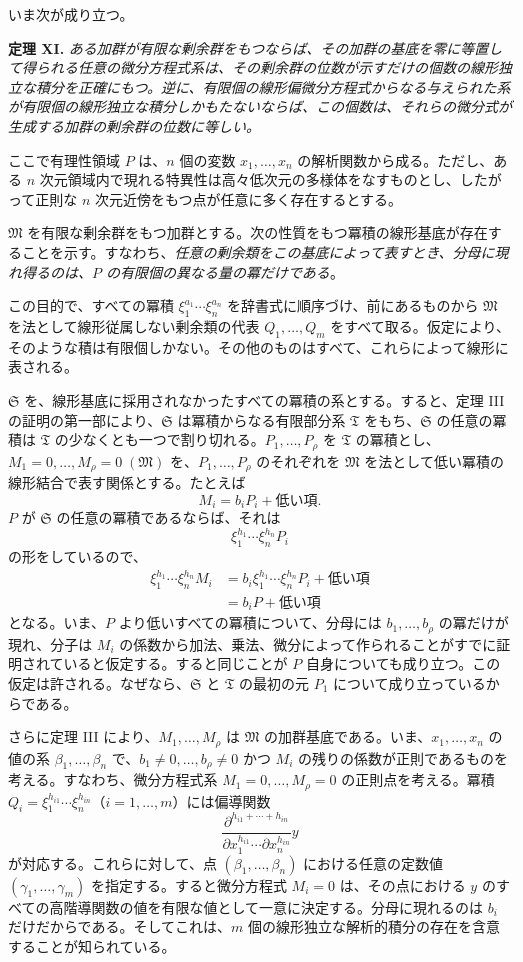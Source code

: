 \documentclass[11pt]{article}
\begin{document}
いま次が成り立つ。

\textbf{定理 XI.} \emph{ある加群が有限な剰余群をもつならば、その加群の基底を零に等置して得られる任意の微分方程式系は、その剰余群の位数が示すだけの個数の線形独立な積分を正確にもつ。逆に、有限個の線形偏微分方程式からなる与えられた系が有限個の線形独立な積分しかもたないならば、この個数は、それらの微分式が生成する加群の剰余群の位数に等しい。}

ここで有理性領域 $P$ は、$n$ 個の変数 $x_1,\ldots,x_n$ の解析関数から成る。ただし、ある $n$ 次元領域内で現れる特異性は高々低次元の多様体をなすものとし、したがって正則な $n$ 次元近傍をもつ点が任意に多く存在するとする。

$\mathfrak M$ を有限な剰余群をもつ加群とする。次の性質をもつ冪積の線形基底が存在することを示す。すなわち、\emph{任意の剰余類をこの基底によって表すとき、分母に現れ得るのは、$P$ の有限個の異なる量の冪だけである}。

この目的で、すべての冪積 $\xi_1^{a_1}\cdots\xi_n^{a_n}$ を辞書式に順序づけ、前にあるものから $\mathfrak M$ を法として線形従属しない剰余類の代表 $Q_1,\ldots,Q_m$ をすべて取る。仮定により、そのような積は有限個しかない。その他のものはすべて、これらによって線形に表される。

$\mathfrak S$ を、線形基底に採用されなかったすべての冪積の系とする。すると、定理 III の証明の第一部により、$\mathfrak S$ は冪積からなる有限部分系 $\mathfrak T$ をもち、$\mathfrak S$ の任意の冪積は $\mathfrak T$ の少なくとも一つで割り切れる。$P_1,\ldots,P_\rho$ を $\mathfrak T$ の冪積とし、$M_1=0,\ldots,M_\rho=0\;(\mathfrak M)$ を、$P_1,\ldots,P_\rho$ のそれぞれを $\mathfrak M$ を法として低い冪積の線形結合で表す関係とする。たとえば
\[
 M_i=b_iP_i+\text{低い項}.
\]
$P$ が $\mathfrak S$ の任意の冪積であるならば、それは
\[
 \xi_1^{h_1}\cdots\xi_n^{h_n}P_i
\]
の形をしているので、
\[
\begin{aligned}
 \xi_1^{h_1}\cdots\xi_n^{h_n}M_i
 &=b_i\xi_1^{h_1}\cdots\xi_n^{h_n}P_i+\text{低い項}\\
 &=b_iP+\text{低い項}
\end{aligned}
\]
となる。いま、$P$ より低いすべての冪積について、分母には $b_1,\ldots,b_\rho$ の冪だけが現れ、分子は $M_i$ の係数から加法、乗法、微分によって作られることがすでに証明されていると仮定する。すると同じことが $P$ 自身についても成り立つ。この仮定は許される。なぜなら、$\mathfrak S$ と $\mathfrak T$ の最初の元 $P_1$ について成り立っているからである。

さらに定理 III により、$M_1,\ldots,M_\rho$ は $\mathfrak M$ の加群基底である。いま、$x_1,\ldots,x_n$ の値の系 $\beta_1,\ldots,\beta_n$ で、$b_1\ne0,\ldots,b_\rho\ne0$ かつ $M_i$ の残りの係数が正則であるものを考える。すなわち、微分方程式系 $M_1=0,\ldots,M_\rho=0$ の正則点を考える。冪積 $Q_i=\xi_1^{h_{i1}}\cdots\xi_n^{h_{in}}$（$i=1,\ldots,m$）には偏導関数
\[
 \frac{\partial^{h_{i1}+\cdots+h_{in}}}{\partial x_1^{h_{i1}}\cdots\partial x_n^{h_{in}}}y
\]
が対応する。これらに対して、点 $(\beta_1,\ldots,\beta_n)$ における任意の定数値 $(\gamma_1,\ldots,\gamma_m)$ を指定する。すると微分方程式 $M_i=0$ は、その点における $y$ のすべての高階導関数の値を有限な値として一意に決定する。分母に現れるのは $b_i$ だけだからである。そしてこれは、$m$ 個の線形独立な解析的積分の存在を含意することが知られている。
\end{document}
